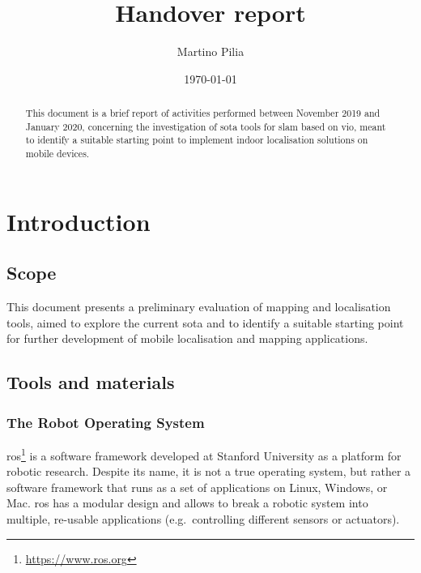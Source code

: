 \documentclass[11pt, letterpaper, twoside]{article}
\title{Handover report}
\author{Martino Pilia}
\date{\today}
\begin{document}
\maketitle

\begin{abstract}
    This document is a brief report of activities performed between November 2019
    and January 2020, concerning the investigation of \gls{sota} tools
    for \gls{slam} based on \gls{vio}, meant to identify a suitable starting point
    to implement indoor localisation solutions on mobile devices.
\end{abstract}

\newpage

\tableofcontents

\newpage

\glsfindwidesttoplevelname[\acronymtype]
\printglossary[type=\acronymtype,style=alttree,title=Abbreviations,nonumberlist]

\newpage

\section{Introduction}

\subsection{Scope}

This document presents a preliminary evaluation of mapping and localisation
tools, aimed to explore the current \gls{sota} and to identify a suitable
starting point for further development of mobile localisation and mapping
applications.

\subsection{Tools and materials}

\subsubsection{The Robot Operating System}

\gls{ros}\footnote{\url{https://www.ros.org}} is a software framework
developed at Stanford University as a platform for robotic research. Despite
its name, it is not a true operating system, but rather a software framework
that runs as a set of applications on Linux, Windows, or Mac. \gls{ros} has a
modular design and allows to break a robotic system into multiple, re-usable
applications (e.g.\ controlling different sensors or actuators).
\end{document}
